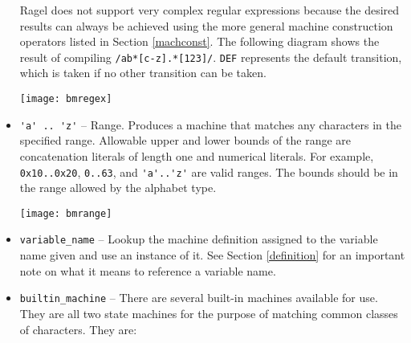 \documentclass[letterpaper,11pt,oneside]{book}
\begin{document}
\begin{itemize}
Ragel does not support very complex regular expressions because the desired
results can always be achieved using the more general machine construction
operators listed in Section \ref{machconst}. The following diagram shows the
result of compiling \verb|/ab*[c-z].*[123]/|. \verb|DEF| represents the default
transition, which is taken if no other transition can be taken. 


\begin{comment}
\begin{verbatim}
main := /ab*[c-z].*[123]/;
\end{verbatim}
\end{comment}

\begin{center}
\texttt{[image: bmregex]}
\end{center}

\item \verb|'a' .. 'z'| -- Range. Produces a machine that matches any
characters in the specified range.  Allowable upper and lower bounds of the
range are concatenation literals of length one and numerical literals.  For
example, \verb|0x10..0x20|, \verb|0..63|, and \verb|'a'..'z'| are valid ranges.
The bounds should be in the range allowed by the alphabet type.

\begin{comment}
\begin{verbatim}
main := 'a' .. 'z';
\end{verbatim}
\end{comment}

\begin{center}
\texttt{[image: bmrange]}
\end{center}


\item \verb|variable_name| -- Lookup the machine definition assigned to the
variable name given and use an instance of it. See Section \ref{definition} for
an important note on what it means to reference a variable name.

\item \verb|builtin_machine| -- There are several built-in machines available
for use. They are all two state machines for the purpose of matching common
classes of characters. They are:

\begin{itemize}


\end{itemize}
\end{itemize}
\end{document}

